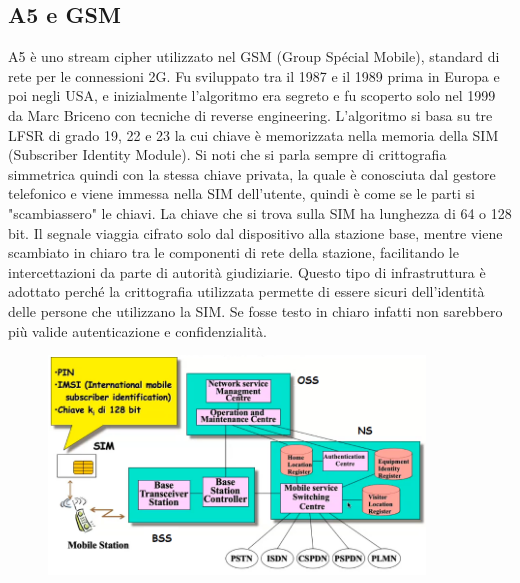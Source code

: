 \subsection{A5 e GSM}
A5 è uno stream cipher utilizzato nel GSM (Group Spécial Mobile), standard di rete per le connessioni 2G. Fu sviluppato tra il 1987 e il 1989 prima in Europa e poi negli USA, e inizialmente l'algoritmo era segreto e fu scoperto solo nel 1999 da Marc Briceno con tecniche di reverse engineering. L'algoritmo si basa su tre LFSR di grado 19, 22 e 23 la cui chiave è memorizzata nella memoria della SIM (Subscriber Identity Module). Si noti che si parla sempre di crittografia simmetrica quindi con la stessa chiave privata, la quale è conosciuta dal gestore telefonico e viene immessa nella SIM dell'utente, quindi è come se le parti si "scambiassero" le chiavi. La chiave che si trova sulla SIM ha lunghezza di 64 o 128 bit. Il segnale viaggia cifrato solo dal dispositivo alla stazione base, mentre viene scambiato in chiaro tra le componenti di rete della stazione, facilitando le intercettazioni da parte di autorità giudiziarie. Questo tipo di infrastruttura è adottato perché la crittografia utilizzata permette di essere sicuri dell'identità delle persone che utilizzano la SIM. Se fosse testo in chiaro infatti non sarebbero più valide autenticazione e confidenzialità.

\begin{figure}[htb!]
    \centering
    \includegraphics[width=10cm]{./Images/cap1/1.34.png}
\end{figure} 

